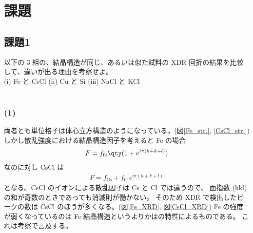 \documentclass[11pt,dvipdfmx,a4paper]{jsarticle}
\begin{document}
\section{課題}
\subsection*{課題1}
以下の 3 組の、結晶構造が同じ、あるいは似た試料の XDR 回折の結果を比較して、違いが出る理由を考察せよ。\\
(i) Fe と CsCl \quad (ii) Cu と Si \quad (iii) NaCl と KCl\\ \\

\subsubsection*{(1)}
両者とも単位格子は体心立方構造のようになっている。(図\ref{Fe_str.}, \ref{CsCl_str.})
しかし散乱強度における結晶構造因子を考えると Fe の場合
\begin{align}
	F = f_{\text{fe}}\qty(1+e^{i\pi(h+k+l)})
\end{align}
なのに対し CsCl は
\begin{align}
	F = f_{\text{Cs}}+f_{\text{Cl}}e^{i\pi(h+k+l)}
\end{align}
となる。CsCl のイオンによる散乱因子は Cs と Cl では違うので、
面指数 (hkl) の和が奇数のときであっても消滅則が働かない。
そのため XDR で検出したピークの数は CsCl のほうが多くなる。(図\ref{Fe_XRD}, 図\ref{CsCl_XRD})
Fe の強度が弱くなっているのは Fe 結晶構造というよりかはの特性によるものである。
これは考察で言及する。\\ %

\end{document}
